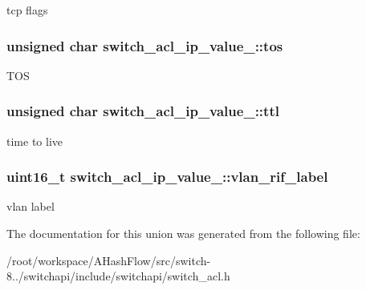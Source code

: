tcp flags \hypertarget{unionswitch__acl__ip__value___ab4432857f0438d287379aba3016f8bdb}{
\subsubsection[{tos}]{\setlength{\rightskip}{0pt plus 5cm}unsigned char switch\+\_\+acl\+\_\+ip\+\_\+value\+\_\+\+::tos}}\label{unionswitch__acl__ip__value___ab4432857f0438d287379aba3016f8bdb}
T\+O\+S \hypertarget{unionswitch__acl__ip__value___a06a2e13b9ea59e563ef4f690ac8fd5c1}{
\subsubsection[{ttl}]{\setlength{\rightskip}{0pt plus 5cm}unsigned char switch\+\_\+acl\+\_\+ip\+\_\+value\+\_\+\+::ttl}}\label{unionswitch__acl__ip__value___a06a2e13b9ea59e563ef4f690ac8fd5c1}
time to live \hypertarget{unionswitch__acl__ip__value___a16ec22e63d7d41e074fe38607915283a}{
\subsubsection[{vlan\+\_\+rif\+\_\+label}]{\setlength{\rightskip}{0pt plus 5cm}uint16\+\_\+t switch\+\_\+acl\+\_\+ip\+\_\+value\+\_\+\+::vlan\+\_\+rif\+\_\+label}}\label{unionswitch__acl__ip__value___a16ec22e63d7d41e074fe38607915283a}
vlan label 

The documentation for this union was generated from the following file\+:\begin{DoxyCompactItemize}
\item 
/root/workspace/\+A\+Hash\+Flow/src/switch-\/8../switchapi/include/switchapi/switch\+\_\+acl.\+h\end{DoxyCompactItemize}
